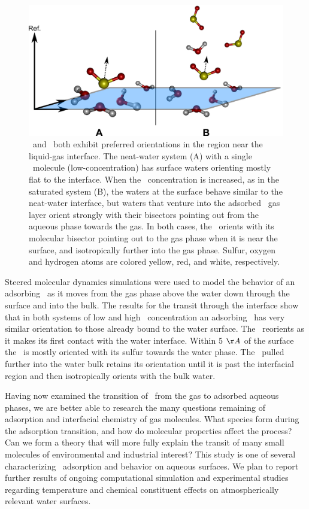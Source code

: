 \begin{figure}[h!]
	\begin{center}
		\includegraphics[scale=1.0]{images/angle-cartoons/system-surface.png}
		\caption{\wat~and \suldiox~both exhibit preferred orientations in the region near the liquid-gas interface. The neat-water system (A) with a single \suldiox~molecule (low-concentration) has surface waters orienting mostly flat to the interface. When the \suldiox~concentration is increased, as in the saturated system (B), the waters at the surface behave similar to the neat-water interface, but waters that venture into the adsorbed \suldiox~gas layer orient strongly with their bisectors pointing out from the aqueous phase towards the gas. In both cases, the \suldiox~orients with its molecular bisector pointing out to the gas phase when it is near the surface, and isotropically further into the gas phase. Sulfur, oxygen and hydrogen atoms are colored yellow, red, and white, respectively.}
		\label{fig:so2-surface-cartoon}
	\end{center}
\end{figure}

Steered molecular dynamics simulations were used to model the behavior of an adsorbing \suldiox~as it moves from the gas phase above the water down through the surface and into the bulk. The results for the transit through the interface show that in both systems of low and high \suldiox~concentration an adsorbing \suldiox~has very similar orientation to those already bound to the water surface. The \suldiox~reorients as it makes its first contact with the water interface. Within 5 $\AA$ of the surface the \suldiox~is mostly oriented with its sulfur towards the water phase. The \suldiox~pulled further into the water bulk retains its orientation until it is past the interfacial region and then isotropically orients with the bulk water.

Having now examined the transition of \suldiox~from the gas to adsorbed aqueous phases, we are better able to research the many questions remaining of adsorption and interfacial chemistry of gas molecules. What species form during the adsorption transition, and how do molecular properties affect the process? Can we form a theory that will more fully explain the transit of many small molecules of environmental and industrial interest? This study is one of several characterizing \suldiox~adsorption and behavior on aqueous surfaces. We plan to report further results of ongoing computational simulation and experimental studies regarding temperature and chemical constituent effects on atmospherically relevant water surfaces.
